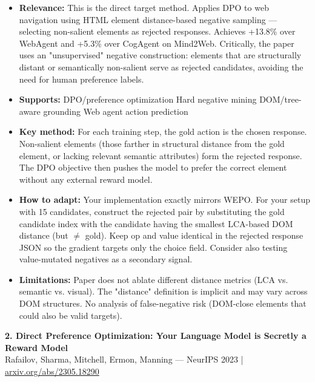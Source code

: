 \documentclass[pdflatex,sn-mathphys-num]{sn-jnl}
\theoremstyle{thmstyleone}
\theoremstyle{thmstyletwo}
\theoremstyle{thmstylethree}
\begin{document}
\begin{itemize}
    \item \textbf{Relevance:} This is the direct target method. Applies DPO to web navigation using HTML element distance-based negative sampling --- selecting non-salient elements as rejected responses. Achieves +13.8\% over WebAgent and +5.3\% over CogAgent on Mind2Web. Critically, the paper uses an "unsupervised" negative construction: elements that are structurally distant or semantically non-salient serve as rejected candidates, avoiding the need for human preference labels.
    \item \textbf{Supports:} \checkmark DPO/preference optimization \checkmark Hard negative mining \checkmark DOM/tree-aware grounding \checkmark Web agent action prediction
    \item \textbf{Key method:} For each training step, the gold action is the chosen response. Non-salient elements (those farther in structural distance from the gold element, or lacking relevant semantic attributes) form the rejected response. The DPO objective then pushes the model to prefer the correct element without any external reward model.
    \item \textbf{How to adapt:} Your implementation exactly mirrors WEPO. For your setup with 15 candidates, construct the rejected pair by substituting the gold candidate index with the candidate having the smallest LCA-based DOM distance (but $\neq$ gold). Keep op and value identical in the rejected response JSON so the gradient targets only the choice field. Consider also testing value-mutated negatives as a secondary signal.
    \item \textbf{Limitations:} Paper does not ablate different distance metrics (LCA vs. semantic vs. visual). The "distance" definition is implicit and may vary across DOM structures. No analysis of false-negative risk (DOM-close elements that could also be valid targets).
\end{itemize}

\textbf{2. Direct Preference Optimization: Your Language Model is Secretly a Reward Model} \\
Rafailov, Sharma, Mitchell, Ermon, Manning --- NeurIPS 2023 | \href{https://arxiv.org/abs/2305.18290}{arxiv.org/abs/2305.18290}
\end{document}
